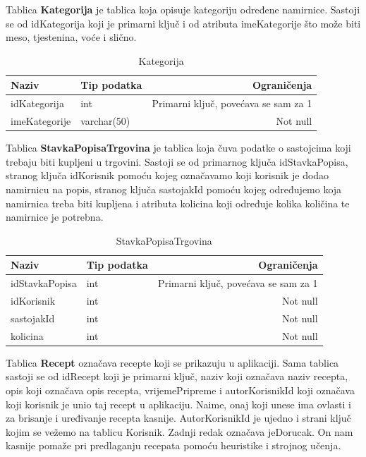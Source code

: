 \documentclass[diplomskirad]{fer}
\begin{document}
Tablica \textbf{Kategorija} je tablica koja opisuje kategoriju određene namirnice. Sastoji se od idKategorija koji je primarni ključ i od atributa imeKategorije što može biti meso, tjestenina, voće i slično.

\begin{table}[htb]
\label{tbl:Kategorija}
\centering
\renewcommand{\arraystretch}{1.3}
\begin{tabular}{llr} \hline
Naziv & Tip podatka & Ograničenja\\ \hline
idKategorija & int & Primarni ključ, povećava se sam za 1 \\
imeKategorije & varchar(50) & Not null\\
\end{tabular}
\caption{Kategorija}
\end{table}

Tablica \textbf{StavkaPopisaTrgovina} je tablica koja čuva podatke o sastojcima koji trebaju biti kupljeni u trgovini. Sastoji se od primarnog ključa idStavkaPopisa, stranog ključa idKorisnik pomoću kojeg označavamo koji korisnik je dodao namirnicu na popis, stranog ključa sastojakId pomoću kojeg određujemo koja namirnica treba biti kupljena i atributa kolicina koji određuje kolika količina te namirnice je potrebna.


\begin{table}[htb]
\label{tbl:PopisTrgovina}
\centering
\renewcommand{\arraystretch}{1.3}
\begin{tabular}{llr} \hline
Naziv & Tip podatka & Ograničenja\\ \hline
idStavkaPopisa & int & Primarni ključ, povećava se sam za 1 \\
idKorisnik & int & Not null\\
sastojakId & int & Not null\\
kolicina & int & Not null\\
\end{tabular}
\caption{StavkaPopisaTrgovina}
\end{table}

Tablica \textbf{Recept} označava recepte koji se prikazuju u aplikaciji. Sama tablica sastoji se od idRecept koji je primarni ključ, naziv koji označava naziv recepta, opis koji označava opis recepta, vrijemePripreme i autorKorisnikId koji označava koji korisnik je unio taj recept u aplikaciju. Naime, onaj koji unese ima ovlasti i za brisanje i uređivanje recepta kasnije. AutorKorisnikId je ujedno i strani ključ kojim se vežemo na tablicu Korisnik. Zadnji redak označava jeDorucak. On nam kasnije pomaže pri predlaganju recepata pomoću heuristike i strojnog učenja.
\end{document}
